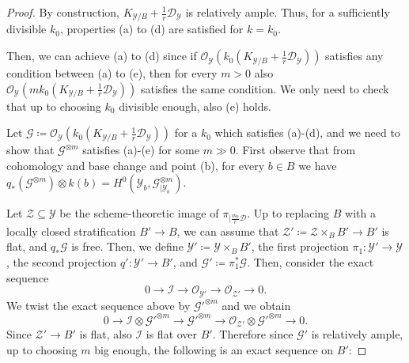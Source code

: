 \documentclass{amsart}
\newcommand{\cD}{\mathcal{D}}
\newcommand{\cG}{\mathcal{G}}
\newcommand{\cI}{\mathcal{I}}
\newcommand{\cO}{\mathcal{O}}
\newcommand{\cY}{\mathcal{Y}}
\newcommand{\cZ}{\mathcal{Z}}
\theoremstyle{definition}
\begin{document}
\begin{proof}
By construction, $K_{\cY/B} + \frac{1}{r}\cD_\cY$ is relatively ample.
Thus, for a sufficiently divisible $k_0$, properties (a) to (d) are satisfied for $k=k_0$.

Then, we can achieve (a) to (d) since if $\cO_\cY(k_0(K_{\cY/B} + \frac{1}{r}\cD_\cY))$ satisfies any condition between (a) to (e), then for every $m>0$ also $\cO_\cY(mk_0(K_{\cY/B} + \frac{1}{r}\cD_\cY))$ satisfies the same condition.
We only need to check that up to choosing $k_0$ divisible enough, also (e) holds.

Let $\cG \coloneqq \cO_\cY(k_0(K_{\cY/B} + \frac{1}{r}\cD_\cY))$ for a $k_0$ which satisfies (a)-(d), and we need to show that
$\cG^{\otimes m}$ satisfies (a)-(e) for some $m\gg 0$.
First observe that from cohomology and base change and point (b), for every $b\in B$ we have $q_*(\cG^{\otimes m})\otimes k(b) = H^0(\cY_b,\cG_{|\cY_b}^{\otimes m})$.

Let $\cZ\subseteq \cY$ be the scheme-theoretic image of $\pi_{|\frac{m_0}{r}\cD}$.
Up to replacing $B$ with a locally closed stratification $B'\to B$, we can assume that $\cZ' \coloneqq \cZ\times_B B'\to B'$ is flat, and $q_*\cG$ is free.
Then, we define $\cY' \coloneqq \cY\times_B B'$, the first projection $\pi_1 \colon \cY'\to \cY$, the second projection $q' \colon \cY'\to B'$, and $\cG' \coloneqq \pi_1^*\cG$.
Then, consider the exact sequence 
\[
0\to \cI\to \cO_{\cY'}\to \cO_{\cZ'} \to 0.
\]
We twist the exact sequence above by $\cG'^{\otimes m}$ and we obtain 
\[
0\to \cI\otimes \cG'^{\otimes m} \to  \cG'^{\otimes m}\to \cO_{\cZ'}\otimes \cG'^{\otimes m} \to 0.
\]
Since $\cZ'\to B'$ is flat, also $\cI$ is flat over $B'$. Therefore since $\cG'$ is relatively ample, up to choosing $m$ big enough, the following is an exact sequence on $B'$:


\end{proof}
\end{document}
